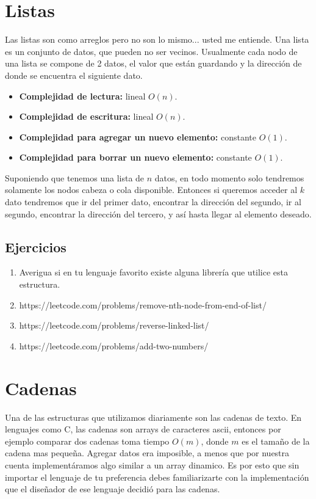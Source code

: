 \section{Listas}

Las listas son como arreglos pero no son lo mismo... usted me entiende. Una lista es un conjunto de datos, que pueden no ser vecinos. Usualmente cada nodo de una lista se compone de 2 datos, el valor que están guardando y la dirección de donde se encuentra el siguiente dato.


\begin{itemize}
    \item \textbf{Complejidad de lectura:} lineal $O(n)$.
    \item \textbf{Complejidad de escritura:} lineal $O(n)$.
    \item \textbf{Complejidad para agregar un nuevo elemento:} constante $O(1)$.
    \item \textbf{Complejidad para borrar un nuevo elemento:} constante $O(1)$.
\end{itemize}


Suponiendo que tenemos una lista de $n$ datos, en todo momento solo tendremos solamente los nodos cabeza o cola disponible. Entonces si queremos acceder al $k$ dato tendremos que ir del primer dato, encontrar la dirección del segundo, ir al segundo, encontrar la dirección del tercero, y así hasta llegar al elemento deseado.

\subsection{Ejercicios}

\begin{enumerate}    
    \item Averigua si en tu lenguaje favorito existe alguna librería que utilice esta estructura.
    \item https://leetcode.com/problems/remove-nth-node-from-end-of-list/
    \item https://leetcode.com/problems/reverse-linked-list/
    \item https://leetcode.com/problems/add-two-numbers/
\end{enumerate}

\section{Cadenas}

Una de las estructuras que utilizamos diariamente son las cadenas de texto. En lenguajes como C, las cadenas son arrays de caracteres ascii, entonces por ejemplo comparar dos cadenas toma tiempo $O(m)$, donde $m$ es el tamaño de la cadena mas pequeña. Agregar datos era imposible, a menos que por nuestra cuenta implementáramos algo similar a un array dinamico. Es por esto que sin importar el lenguaje de tu preferencia debes familiarizarte con la implementación que el diseñador de ese lenguaje decidió para las cadenas.

